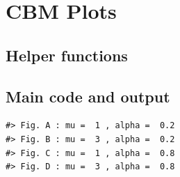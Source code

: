 \documentclass[
]{book}
\begin{document}
\hypertarget{CbmPlots}{%
\chapter{CBM Plots}\label{CbmPlots}}

\hypertarget{helper-functions-2}{%
\section{Helper functions}\label{helper-functions-2}}

\hypertarget{main-code-and-output-2}{%
\section{Main code and output}\label{main-code-and-output-2}}

\begin{verbatim}
#> Fig. A : mu =  1 , alpha =  0.2
#> Fig. B : mu =  3 , alpha =  0.2
#> Fig. C : mu =  1 , alpha =  0.8
#> Fig. D : mu =  3 , alpha =  0.8
\end{verbatim}
\end{document}
